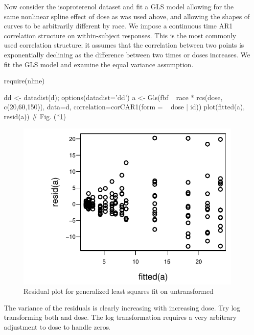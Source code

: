 Now consider the isoproterenol dataset and fit a GLS model allowing for
the same nonlinear spline effect of dose as was used above, and
allowing the shapes of curves to be arbitrarily different by race.  We
impose a continuous time AR1 correlation structure on within-subject
responses.  This is the most commonly used correlation structure; it
assumes that the correlation between two points is exponentially
declining as the difference between two times or doses
increases.
We fit the GLS model and examine the equal variance assumption.
\begin{Schunk}
\begin{Sinput}
require(nlme)
\end{Sinput}
\begin{Sinput}
dd <- datadist(d); options(datadist='dd')
a <- Gls(fbf ~ race * rcs(dose, c(20,60,150)), data=d,
         correlation=corCAR1(form = ~ dose | id))
plot(fitted(a), resid(a))   # Fig. (*\ref{fig:serial-glsa}\ipacue*)
\end{Sinput}
\begin{figure}[htbp]

\centerline{\includegraphics{serial-glsa-1} }

\caption[Residual plot for generalized least squares fit on untransformed  ]{Residual plot for generalized least squares fit on untransformed  }\label{fig:serial-glsa}
\end{figure}
\end{Schunk}
The variance of the residuals is clearly increasing with increasing
dose.  Try log transforming both  and dose.  The log
transformation requires a very arbitrary adjustment to dose to handle zeros.
